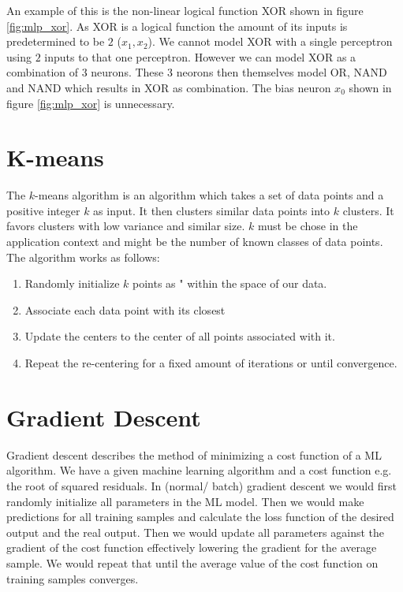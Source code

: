 An example of this is the non-linear logical function XOR shown in figure \ref{fig:mlp_xor}. As XOR is a logical function the amount of its inputs is predetermined to be $2$ ($x_{1}, x_{2}$). We cannot model XOR with a single perceptron using $2$ inputs to that one perceptron. However we can model XOR as a combination of 3 neurons. These 3 neorons then themselves model OR, NAND and NAND which results in XOR as combination. The bias neuron $x_{0}$ shown in figure \ref{fig:mlp_xor} is unnecessary.

\section{K-means}

The $k$-means algorithm is an algorithm which takes a set of data points and a positive integer $k$ as input. It then clusters similar data points into $k$ clusters. It favors clusters with low variance and similar size. $k$ must be chose in the application context and might be the number of known classes of data points.\\

The algorithm works as follows:
\begin{enumerate}
    \item Randomly initialize $k$ points as " within the space of our data.
    \item Associate each data point with its closest 
    \item Update the centers to the center of all points associated with it.
    \item Repeat the re-centering for a fixed amount of iterations or until convergence.
\end{enumerate}

\section{Gradient Descent}

Gradient descent describes the method of minimizing a cost function of a ML algorithm. We have a given machine learning algorithm and a cost function e.g. the root of squared residuals. In (normal/ batch) gradient descent we would first randomly initialize all parameters in the ML model. Then we would make predictions for all training samples and calculate the loss function of the desired output and the real output. Then we would update all parameters against the gradient of the cost function effectively lowering the gradient for the average sample. We would repeat that until the average value of the cost function on training samples converges.

